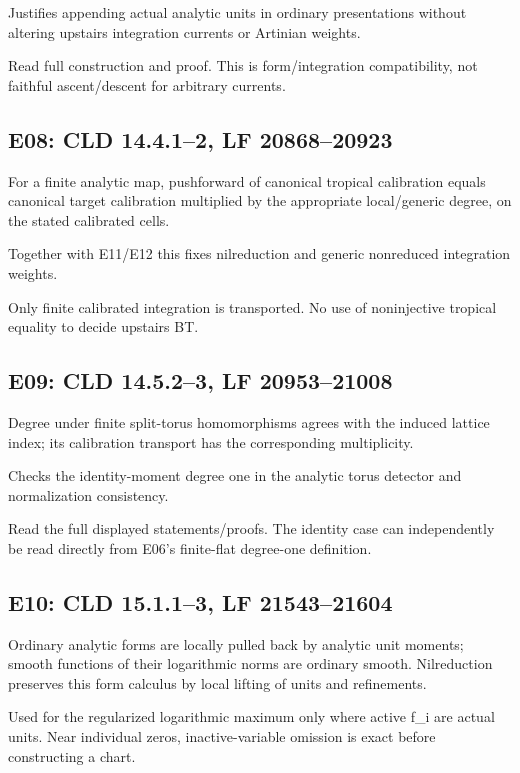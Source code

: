 \documentclass[11pt]{article}
\begin{document}
Justifies appending actual analytic units in ordinary presentations without altering upstairs integration currents or Artinian weights.

Read full construction and proof. This is form/integration compatibility, not faithful ascent/descent for arbitrary currents.

\subsection*{E08: CLD 14.4.1--2, LF 20868--20923}

For a finite analytic map, pushforward of canonical tropical calibration equals canonical target calibration multiplied by the appropriate local/generic degree, on the stated calibrated cells.

Together with E11/E12 this fixes nilreduction and generic nonreduced integration weights.

Only finite calibrated integration is transported. No use of noninjective tropical equality to decide upstairs BT.

\subsection*{E09: CLD 14.5.2--3, LF 20953--21008}

Degree under finite split-torus homomorphisms agrees with the induced lattice index; its calibration transport has the corresponding multiplicity.

Checks the identity-moment degree one in the analytic torus detector and normalization consistency.

Read the full displayed statements/proofs. The identity case can independently be read directly from E06's finite-flat degree-one definition.

\subsection*{E10: CLD 15.1.1--3, LF 21543--21604}

Ordinary analytic forms are locally pulled back by analytic unit moments; smooth functions of their logarithmic norms are ordinary smooth. Nilreduction preserves this form calculus by local lifting of units and refinements.

Used for the regularized logarithmic maximum only where active f\_i are actual units. Near individual zeros, inactive-variable omission is exact before constructing a chart.
\end{document}

